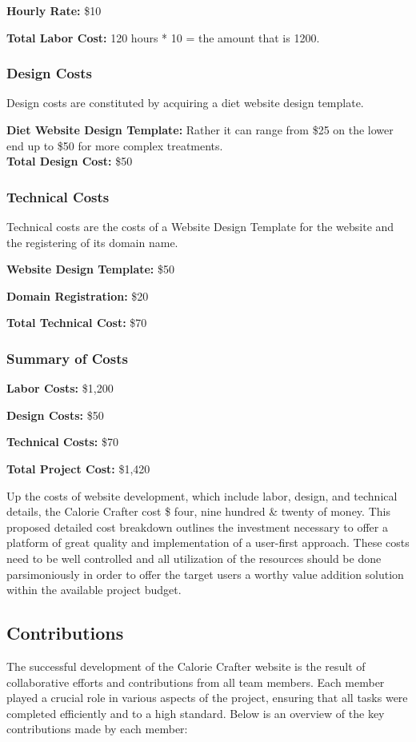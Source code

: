 \documentclass[a4paper,12pt]{article}
\begin{document}
\noindent\textbf{Hourly Rate:} \$10

\noindent\textbf{Total Labor Cost:} 120 hours * 10 = the amount that is 1200.


\subsubsection{Design Costs}
Design costs are constituted by acquiring a diet website design template.

\noindent\textbf{Diet Website Design Template:} Rather it can range from \$25 on the lower end up to \$50 for more complex treatments.
 \\ \noindent\textbf{Total Design Cost:} \$50

\subsubsection{Technical Costs}

Technical costs are the costs of a Website Design Template for the website and the registering of its domain name.

\noindent\textbf{Website Design Template:} \$50

\noindent\textbf{Domain Registration:} \$20

\noindent\textbf{Total Technical Cost:} \$70

\newpage
\subsubsection{Summary of Costs}
\noindent\textbf{Labor Costs:} \$1,200

\noindent\textbf{Design Costs:} \$50

\noindent\textbf{Technical Costs:} \$70

\noindent\textbf{Total Project Cost:} \$1,420
\vspace{1cm}

\noindent\Summing Up the costs of website development, which include labor, design, and technical details, the Calorie Crafter cost \$ four, nine hundred & twenty of money. This proposed detailed cost breakdown outlines the investment necessary to offer a platform of great quality and implementation of a user-first approach. These costs need to be well controlled and all utilization of the resources should be done parsimoniously in order to offer the target users a worthy value addition solution within the available project budget.


\subsection{Contributions}
The successful development of the Calorie Crafter website is the result of collaborative efforts and contributions from all team members. Each member played a crucial role in various aspects of the project, ensuring that all tasks were completed efficiently and to a high standard. Below is an overview of the key contributions made by each member:
\end{document}
